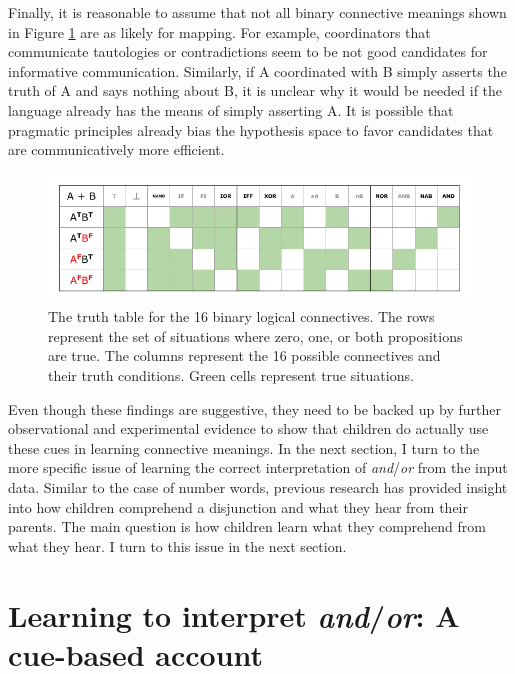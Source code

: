 \documentclass[oneside]{report}
\theoremstyle{definition}
\theoremstyle{definition}
\theoremstyle{definition}
\theoremstyle{remark}
\begin{document}
Finally, it is reasonable to assume that not all binary connective
meanings shown in Figure \ref{fig:binaryLogicalConnectivess} are as
likely for mapping. For example, coordinators that communicate
tautologies or contradictions seem to be not good candidates for
informative communication. Similarly, if A coordinated with B simply
asserts the truth of A and says nothing about B, it is unclear why it
would be needed if the language already has the means of simply
asserting A. It is possible that pragmatic principles already bias the
hypothesis space to favor candidates that are communicatively more
efficient.
\begin{figure}[tb]

{\centering \includegraphics{figs/binaryLogicalConnectivess-1} 

}

\caption{The truth table for the 16 binary logical connectives. The rows represent the set of situations where zero, one, or both propositions are true. The columns represent the 16 possible connectives and their truth conditions. Green cells represent true situations.}\label{fig:binaryLogicalConnectivess}
\end{figure}
Even though these findings are suggestive, they need to be backed up by
further observational and experimental evidence to show that children do
actually use these cues in learning connective meanings. In the next
section, I turn to the more specific issue of learning the correct
interpretation of \emph{and}/\emph{or} from the input data. Similar to
the case of number words, previous research has provided insight into
how children comprehend a disjunction and what they hear from their
parents. The main question is how children learn what they comprehend
from what they hear. I turn to this issue in the next section.

\section{\texorpdfstring{Learning to interpret \emph{and}/\emph{or}: A
cue-based
account}{Learning to interpret and/or: A cue-based account}}\label{myaccount}
\end{document}
